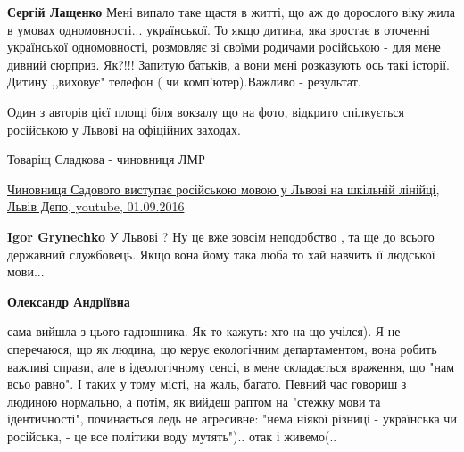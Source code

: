 \begin{itemize}
\begin{itemize}
\textbf{Сергій Лащенко} Мені випало таке щастя в житті, що аж до дорослого віку
жила в умовах одномовності... української. То якщо дитина, яка зростає в оточенні
української одномовності, розмовляє зі своїми родичами російською - для мене
дивний сюрприз. Як?!!! Запитую батьків, а вони мені розказують ось такі
історії. Дитину ,,виховує" телефон ( чи комп'ютер).Важливо - результат.

\end{itemize}

 

Один з авторів цієї площі біля вокзалу що на фото, відкрито спілкується
російською у Львові на офіційних заходах.

Товаріщ Сладкова - чиновниця ЛМР 

\href{https://youtu.be/xE-ZQYuIjLQ}{%
Чиновниця Садового виступає російською мовою у Львові на шкільній лінійці,%
Львів Депо, youtube, 01.09.2016
}

\begin{itemize}
 
\textbf{Igor Grynechko} У Львові ? Ну це вже зовсім неподобство , та ще до всього
державний службовець. Якщо вона йому така люба то хай навчить її людської
мови...

 
\textbf{Олександр Андріївна} 

сама вийшла з цього гадюшника. Як то кажуть: хто на що учілся). Я не
сперечаюся, що як людина, що керує екологічним департаментом, вона робить
важливі справи, але в ідеологічному сенсі, в мене складається враження, що "нам
всьо равно". І таких у тому місті, на жаль, багато. Певний час говориш з
людиною нормально, а потім, як вийдеш раптом на "стежку мови та ідентичності",
починається ледь не агресивне: "нема ніякої різниці - українська чи російська,
- це все політики воду мутять").. отак і живемо(..



\end{itemize}
\end{itemize}
